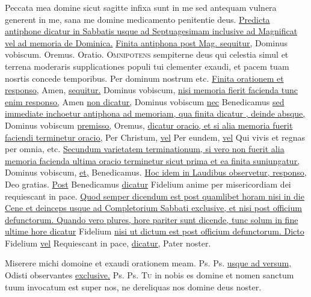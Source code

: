 \begin{multicols*}{2}
 Peccata mea domine sicut sagitte infixa sunt in me sed antequam vulnera generent in me, sana me domine medicamento penitentie deus.
\newline \ul{Predicta antiphone dicatur in Sabbatis usque ad Septuagesimam inclusive ad Magnificat vel ad memoria de Dominica.}
\newline \ul{Finita antiphona post Mag. sequitur,} Dominus vobiscum. Oremus. {\color{Red} Oratio.}
\lettrine[lines=2]{\zallmancaps \color{Red} O}{mnipotens} \hypertarget{omnipotens-sempiterne-dom-i-post}{sempiterne} deus qui celestia simul et terrena moderaris supplicationes populi tui clementer exaudi, et pacem tuam nosrtis concede temporibus. Per dominum nostrum etc.
\newline \ul{Finita orationem et responso,} Amen, \ul{sequitur.} Dominus vobiscum, \ul{nisi memoria fierit facienda tunc enim responso,} Amen \ul{non dicatur,} Dominus vobiscum \ul{nec} Benedicamus \ul{sed immediate inchoetur antiphona ad memoriam, qua finita dicatur \Vbar , deinde absque,} Dominus vobiscum \ul{premisso,} Oremus, \ul{dicatur oracio, et si alia memoria fuerit faciendi terminetur oracio,} Per Christum, \ul{vel} Per eundem, \ul{vel} Qui vivis et regnas per omnia, etc. \ul{Secundum varietatem terminationum, si vero non fuerit alia memoria facienda ultima oracio terminetur sicut prima et ea finita suniungatur,} Dominus vobiscum, \ul{et,} Benedicamus. \ul{Hoc idem in Laudibus observetur, responso,} Deo gratias. \ul{Post} Benedicamus \ul{dicatur} Fidelium anime per misericordiam dei requiescant in pace. \ul{Quod semper dicendum est post quamlibet horam nisi in die Cene et deinceps usque ad Completorium Sabbati exclusive, et nisi post officium defunctorum. Quando vero plures, hore pariter sunt dicende, tunc solum in fine ultime hore dicatur} Fidelium \ul{nisi ut dictum est post officium defunctorum. Dicto} Fidelium \ul{vel} Requiescant in pace, \ul{dicatur,} Pater noster.
{\color{Red} }
\par {} Miserere michi domoine et exaudi orationem meam. {\color{Red} Ps.}  {\color{Red} Ps.}  \ul{usque ad versum,} Odisti observantes \ul{exclusive.} {\color{Red} Ps.}  {\color{Red} Ps.} 
\lettrine[lines=2]{\zallmancaps \color{Blue} T}{u} in nobis es domine et nomen sanctum tuum invocatum est super nos, ne dereliquas nos domine deus noster.
\begin{responsory-breve}

\end{responsory-breve}
\end{multicols*}
